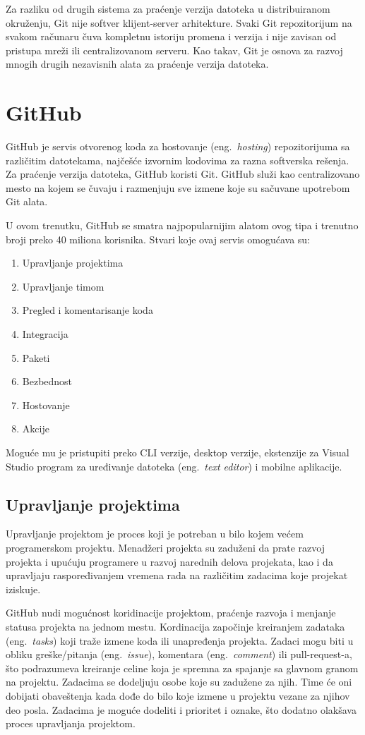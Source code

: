 \documentclass[12pt]{report}
\begin{document}
Za razliku od drugih sistema za praćenje verzija datoteka u distribuiranom okruženju, Git nije softver klijent-server arhitekture. Svaki Git repozitorijum na svakom računaru čuva kompletnu istoriju promena i verzija i nije zavisan od pristupa mreži ili centralizovanom serveru. Kao takav, Git je osnova za razvoj mnogih drugih nezavisnih alata za praćenje verzija datoteka.

\section{GitHub}
GitHub \cite{github} je servis otvorenog koda za hostovanje (eng.\ \textit{hosting}) repozitorijuma sa različitim datotekama, najčešće izvornim kodovima za razna softverska rešenja. Za praćenje verzija datoteka, GitHub koristi Git. GitHub služi kao centralizovano mesto na kojem se čuvaju i razmenjuju sve izmene koje su sačuvane upotrebom Git alata.

U ovom trenutku, GitHub se smatra najpopularnijim alatom ovog tipa i trenutno broji preko 40 miliona korisnika. Stvari koje ovaj servis omogućava su:

\begin{enumerate}
    \item Upravljanje projektima
    \item Upravljanje timom
    \item Pregled i komentarisanje koda
    \item Integracija
    \item Paketi
    \item Bezbednost
    \item Hostovanje
    \item Akcije
\end{enumerate}

Moguće mu je pristupiti preko CLI verzije, desktop verzije, ekstenzije za Visual Studio program za uređivanje datoteka (eng.\ \textit{text editor}) i mobilne aplikacije.

\subsection{Upravljanje projektima}
Upravljanje projektom je proces koji je potreban u bilo kojem većem programerskom projektu. Menadžeri projekta su zaduženi da prate razvoj projekta i upućuju programere u razvoj narednih delova projekata, kao i da upravljaju raspoređivanjem vremena rada na različitim zadacima koje projekat iziskuje.

GitHub nudi mogućnost koridinacije projektom, praćenje razvoja i menjanje statusa projekta na jednom mestu. Kordinacija započinje kreiranjem zadataka (eng.\ \textit{tasks}) koji traže izmene koda ili unapređenja projekta. Zadaci mogu biti u obliku greške/pitanja (eng.\ \textit{issue}), komentara (eng.\ \textit{comment}) ili pull-request-a, što podrazumeva kreiranje celine koja je spremna za spajanje sa glavnom granom na projektu. Zadacima se dodeljuju osobe koje su zadužene za njih. Time će oni dobijati obaveštenja kada dođe do bilo koje izmene u projektu vezane za njihov deo posla. Zadacima je moguće dodeliti i prioritet i oznake, što dodatno olakšava proces upravljanja projektom.
\end{document}
